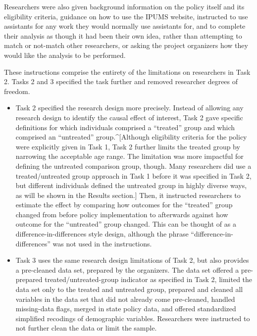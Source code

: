 \documentclass[
  letterpaper,
  DIV=11,
  numbers=noendperiod]{scrartcl}
\begin{document}
Researchers were also given background information on the policy itself
and its eligibility criteria, guidance on how to use the IPUMS website,
instructed to use assistants for any work they would normally use
assistants for, and to complete their analysis as though it had been
their own idea, rather than attempting to match or not-match other
researchers, or asking the project organizers how they would like the
analysis to be performed.

These instructions comprise the entirety of the limitations on
researchers in Task 2. Tasks 2 and 3 specified the task further and
removed researcher degrees of freedom.

\begin{itemize}
\item
  Task 2 specified the research design more precisely. Instead of
  allowing any research design to identify the causal effect of
  interest, Task 2 gave specific definitions for which individuals
  comprised a ``treated'' group and which comprised an ``untreated''
  group.\^{}{[}Although eligibility criteria for the policy were
  explicitly given in Task 1, Task 2 further limits the treated group by
  narrowing the acceptable age range. The limitation was more impactful
  for defining the untreated comparison group, though. Many researchers
  did use a treated/untreated group approach in Task 1 before it was
  specified in Task 2, but different individuals defined the untreated
  group in highly diverse ways, as will be shown in the Results
  section.{]} Then, it instructed researchers to estimate the effect by
  comparing how outcomes for the ``treated'' group changed from before
  policy implementation to afterwards against how outcome for the
  ``untreated'' group changed. This can be thought of as a
  difference-in-differences style design, although the phrase
  ``difference-in-differences'' was not used in the instructions.
\item
  Task 3 uses the same research design limitations of Task 2, but also
  provides a pre-cleaned data set, prepared by the organizers. The data
  set offered a pre-prepared treated/untreated-group indicator as
  specified in Task 2, limited the data set only to the treated and
  untreated group, prepared and cleaned all variables in the data set
  that did not already come pre-cleaned, handled missing-data flags,
  merged in state policy data, and offered standardized simplified
  recodings of demographic variables. Researchers were instructed to not
  further clean the data or limit the sample.
\end{itemize}
\end{document}
